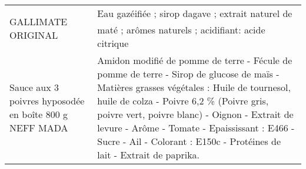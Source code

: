 \begin{longtable}{p{5cm}p{10cm}}
                                                                                       GALLIMATE ORIGINAL &                                                                                                                                                                                                                                                                                                                                                                                                                                                                                                                                                                                                                                                                                                                                                                                                                                                                                                                                  Eau gazéifiée ; sirop dagave ; extrait naturel de maté ; arômes  naturels ; acidifiant: acide citrique \\
                                                   Sauce aux 3 poivres hyposodée en boîte 800 g NEFF MADA &                                                                                                                                                                                                                                                                                                                                                                                                                                                                                                                                                                                                                                                                          Amidon modifié de pomme de terre - Fécule de pomme de terre - Sirop de glucose de maïs - Matières grasses végétales : Huile de tournesol, huile de colza - Poivre 6,2 \% (Poivre gris, poivre vert, poivre blanc) - Oignon - Extrait de levure - Arôme - Tomate - Epaississant : E466 - Sucre - Ail - Colorant : E150c - Protéines de lait - Extrait de paprika. \\

\end{longtable}
